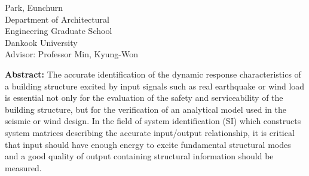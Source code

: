 \begin{center}
\end{center}
\begin{flushright}
Park, Eunchurn\\
Department of Architectural\\
Engineering Graduate School\\
Dankook University\\
\vspace{0.3cm}
Advisor: Professor Min, Kyung-Won
\end{flushright}
{\large\textbf{Abstract:}}
The accurate identification of the dynamic response characteristics of a building structure excited by input signals such as real earthquake or wind load is essential not only for the evaluation of the safety and serviceability of the building structure, but for the verification of an analytical model used in the seismic or wind design. In the field of system identification (SI) which constructs system matrices describing the accurate input/output relationship, it is critical that input should have enough energy to excite fundamental structural modes and a good quality of output containing structural information should be measured.
